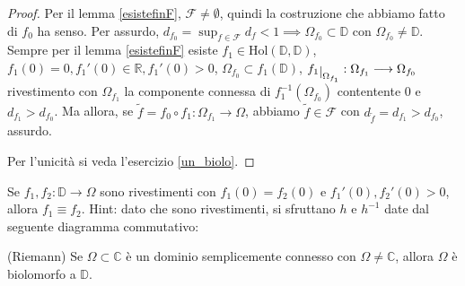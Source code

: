 \begin{proof}
  Per il lemma \ref{esistefinF}, $\mathcal{F}\not=\emptyset$, quindi la costruzione che abbiamo fatto di $f_0$ ha senso. Per assurdo, $\displaystyle d_{f_0}=\sup_{f \in \mathcal{F}} d_f<1 \implies \Omega_{f_0} \subset \mathbb{D}$ con $\Omega_{f_0} \not= \mathbb{D}$.
  Sempre per il lemma \ref{esistefinF} esiste $f_1 \in \text{Hol}(\mathbb{D}, \mathbb{D})$, $f_1(0)=0, f_1'(0) \in \mathbb{R}, f_1'(0)>0$, $\Omega_{f_0} \subset f_1(\mathbb{D})$, $f_1\restrict{\Omega_{f_1}}:\Omega_{f_1} \longrightarrow \Omega_{f_0}$ rivestimento con $\Omega_{f_1}$ la componente connessa di $f_1^{-1}(\Omega_{f_0})$ contentente $0$ e $d_{f_1}>d_{f_0}$.
  Ma allora, se $\tilde{f}=f_0 \circ f_1:\Omega_{f_1} \longrightarrow \Omega$, abbiamo $\tilde{f} \in \mathcal{F}$ con $d_{\tilde{f}}=d_{f_1}>d_{f_0}$, assurdo.

  Per l'unicità si veda l'esercizio \ref{un_biolo}.
\end{proof}

\begin{exc} \label{un_biolo}
  Se $f_1, f_2:\mathbb{D} \longrightarrow \Omega$ sono rivestimenti con $f_1(0)=f_2(0)$ e $f_1'(0), f_2'(0)>0$, allora $f_1 \equiv f_2$. Hint: dato che sono rivestimenti, si sfruttano $h$ e $h^{-1}$ date dal seguente diagramma commutativo:
  \begin{center}
  \end{center}
\end{exc}

\begin{thm}
  (Riemann) Se $\Omega \subset \mathbb{C}$ è un dominio semplicemente connesso con $\Omega \not=\mathbb{C}$, allora $\Omega$ è biolomorfo a $\mathbb{D}$.
\end{thm}

